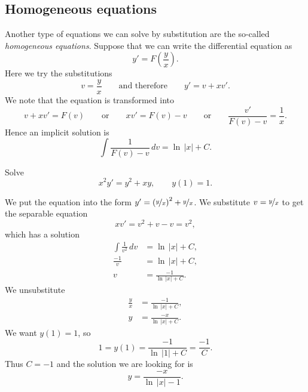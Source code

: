 \subsection{Homogeneous equations}

Another type of equations we can solve by substitution are the 
so-called \emph{homogeneous equations}.
Suppose that we can write the differential equation as
\begin{equation*}
y' = F\left(\frac{y}{x}\right) .
\end{equation*}
Here we try the substitutions
\begin{equation*}
v = \frac{y}{x} \qquad \text{and therefore} \qquad y' = v + x v' .
\end{equation*}
We note that the equation is transformed into
\begin{equation*}
v+ xv' = F(v) \qquad \text{or} \qquad xv' = F(v)-v 
\qquad \text{or} \qquad \frac{v'}{F(v)-v} = \frac{1}{x} .
\end{equation*}
Hence an implicit solution is
\begin{equation*}
\int \frac{1}{F(v)-v} \,dv = \ln \, \lvert x \rvert + C .
\end{equation*}

\begin{example}
Solve 
\begin{equation*}
x^2y' = y^2+xy, \qquad y(1)=1.
\end{equation*}

We put the equation into
the form $y'= {\left(\nicefrac{y}{x}\right)}^2+\nicefrac{y}{x}$.  We 
substitute $v=\nicefrac{y}{x}$ to get
the separable equation
\begin{equation*}
xv' = v^2+v-v = v^2 ,
\end{equation*}
which has a solution
\begin{align*}
\int \frac{1}{v^2} \,dv &= \ln \, \lvert x \rvert + C , \\
\frac{-1}{v} &= \ln \, \lvert x \rvert + C , \\
v &= \frac{-1}{\ln \, \lvert x \rvert + C} .
\end{align*}
We unsubstitute
\begin{align*}
\frac{y}{x} &= \frac{-1}{\ln \, \lvert x \rvert + C} , \\
y &= \frac{-x}{\ln \, \lvert x \rvert + C} .
\end{align*}
We want $y(1)=1$, so 
\begin{equation*}
1 = y(1) = \frac{-1}{\ln \, \lvert 1 \rvert + C} = \frac{-1}{C} .
\end{equation*}
Thus $C = -1$ and
the solution we are looking for is
\begin{equation*}
y = \frac{-x}{\ln \, \lvert x \rvert -1} .
\end{equation*}
\end{example}

